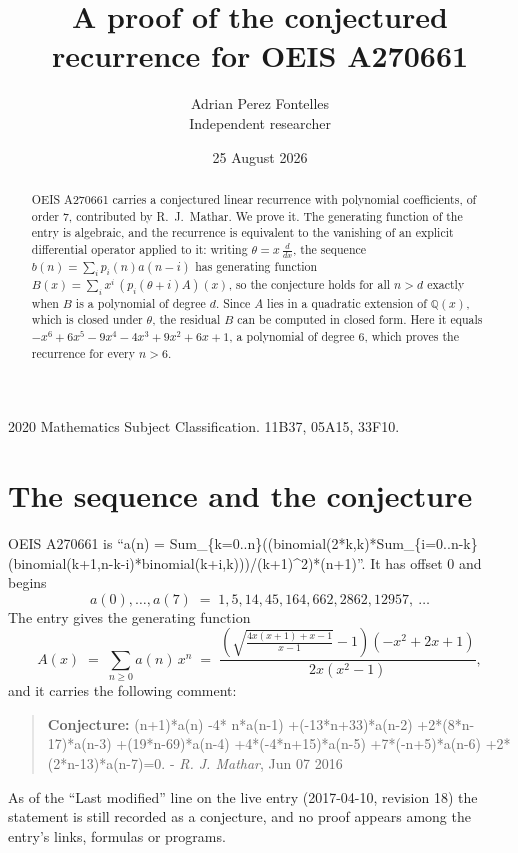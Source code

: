 \documentclass[11pt,a4paper]{article}
\title{A proof of the conjectured recurrence for OEIS A270661}
\author{Adrian Perez Fontelles\\ \small Independent researcher}
\date{25 August 2026}
\theoremstyle{plain}
\theoremstyle{definition}
\begin{document}
\maketitle

\begin{abstract}
OEIS A270661 carries a conjectured linear recurrence with polynomial coefficients, of
order 7, contributed by R.~J.~Mathar. We prove it. The generating function of the
entry is algebraic, and the recurrence is equivalent to the vanishing of an explicit
differential operator applied to it: writing $\theta=x\,\frac{d}{dx}$, the sequence
$b(n)=\sum_{i}p_{i}(n)a(n-i)$ has generating function
$B(x)=\sum_{i}x^{i}\,(p_{i}(\theta+i)A)(x)$, so the conjecture holds for all $n>d$ exactly
when $B$ is a polynomial of degree $d$. Since $A$ lies in a quadratic extension of
$\mathbb{Q}(x)$, which is closed under $\theta$, the residual $B$ can be computed in
closed form. Here it equals $- x^{6} + 6 x^{5} - 9 x^{4} - 4 x^{3} + 9 x^{2} + 6 x + 1$, a polynomial of degree $6$, which proves
the recurrence for every $n>6$.
\end{abstract}

\noindent\small 2020 Mathematics Subject Classification. 11B37, 05A15, 33F10.\normalsize

\section{The sequence and the conjecture}

OEIS A270661 is ``a(n) = Sum\_\{k=0..n\}((binomial(2*k,k)*Sum\_\{i=0..n-k\}(binomial(k+1,n-k-i)*binomial(k+i,k)))/(k+1)\^{}2)*(n+1)''. It has offset $0$ and begins
\[
a(0),\dots,a(7)\;=\;1, 5, 14, 45, 164, 662, 2862, 12957,\ \dots
\]
The entry gives the generating function
\begin{equation}\label{eq:gf}
A(x)\;=\;\sum_{n\ge 0} a(n)\,x^{n}\;=\;\frac{\left(\sqrt{\frac{4 x \left(x + 1\right) + x - 1}{x - 1}} - 1\right) \left(- x^{2} + 2 x + 1\right)}{2 x \left(x^{2} - 1\right)} ,
\end{equation}
and it carries the following comment:
\begin{quote}\small
\textbf{Conjecture:} (n+1)*a(n) -4* n*a(n-1) +(-13*n+33)*a(n-2) +2*(8*n-17)*a(n-3) +(19*n-69)*a(n-4) +4*(-4*n+15)*a(n-5) +7*(-n+5)*a(n-6) +2*(2*n-13)*a(n-7)=0. - \emph{R. J. Mathar}, Jun 07 2016
\end{quote}
As of the ``Last modified'' line on the live entry (2017-04-10, revision 18) the
statement is still recorded as a conjecture, and no proof appears among the entry's links,
formulas or programs.
\end{document}
